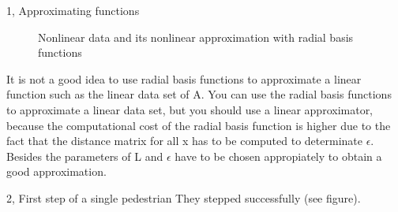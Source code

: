\documentclass[10pt,a4paper]{article}
\begin{document}
\begin{task}{1, Approximating functions}
\begin{figure}[H]
\caption{Nonlinear data and its nonlinear approximation with radial basis functions}
\label{fig:task1_3}
\end{figure}
It is not a good idea to use radial basis functions to approximate a linear function such as the linear data set of A. You can use the radial basis functions to approximate a linear data set, but you should use a linear approximator, because the computational cost of the radial basis function is higher due to the fact that the distance matrix for all x has to be computed to determinate $\epsilon$. Besides the parameters of L and $\epsilon$ have to be chosen appropiately to obtain a good approximation.
\end{task}
\begin{task}{2, First step of a single pedestrian}
They stepped successfully (see figure).
\end{task}
\end{document}

